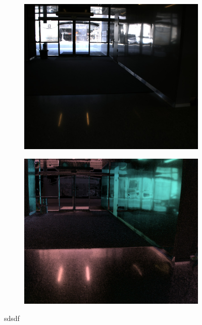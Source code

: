 \begin{figure}[H]
    \begin{subfigure}[T]{.49\textwidth}
        \includegraphics[width=\textwidth]{figures/pictures/img_9306_s0.jpg}
    \end{subfigure} \hfill
    \begin{subfigure}[T]{.49\textwidth}
        \includegraphics[width=\textwidth]{figures/pictures/img_9306_pol.jpg}
    \end{subfigure}
    \caption{sdsdf}
\end{figure}
\vspace{-.5cm}


